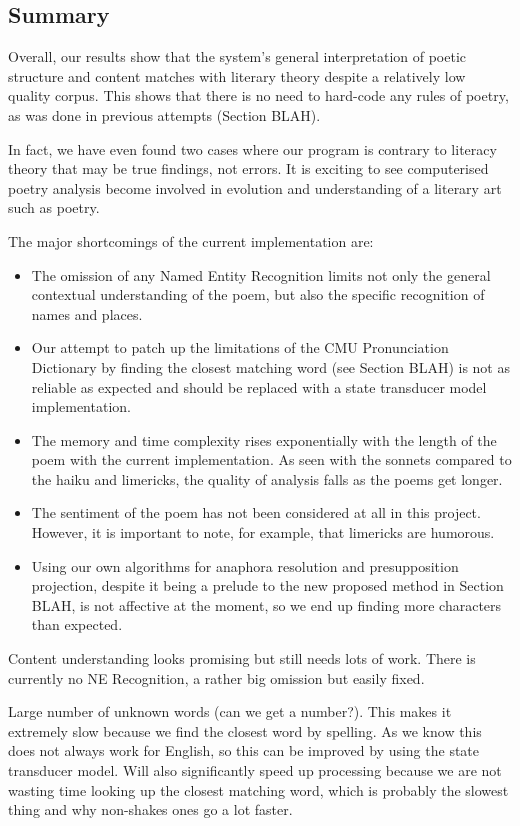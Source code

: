 \subsection{Summary}
Overall, our results show that the system's general interpretation of poetic structure and content matches with literary theory despite a relatively low quality corpus. This shows that there is no need to hard-code any rules of poetry, as was done in previous attempts (Section BLAH).

In fact, we have even found two cases where our program is contrary to literacy theory that may be true findings, not errors. It is exciting to see computerised poetry analysis become involved in evolution and understanding of a literary art such as poetry.

The major shortcomings of the current implementation are:
\begin{itemize}
\item{The omission of any Named Entity Recognition limits not only the general contextual understanding of the poem, but also the specific recognition of names and places.}
\item{Our attempt to patch up the limitations of the CMU Pronunciation Dictionary by finding the closest matching word (see Section BLAH) is not as reliable as expected and should be replaced with a state transducer model implementation.}
\item{The memory and time complexity rises exponentially with the length of the poem with the current implementation. As seen with the sonnets compared to the haiku and limericks, the quality of analysis falls as the poems get longer.}
\item{The sentiment of the poem has not been considered at all in this project. However, it is important to note, for example, that limericks are humorous.}
\item{Using our own algorithms for anaphora resolution and presupposition projection, despite it being a prelude to the new proposed method in Section BLAH, is not affective at the moment, so we end up finding more characters than expected.}
\end{itemize}

Content understanding looks promising but still needs lots of work. There is currently no NE Recognition, a rather big omission but easily fixed.

Large number of unknown words (can we get a number?). This makes it extremely slow because we find the closest word by spelling. As we know this does not always work for English, so this can be improved by using the state transducer model. Will also significantly speed up processing because we are not wasting time looking up the closest matching word, which is probably the slowest thing and why non-shakes ones go a lot faster.

